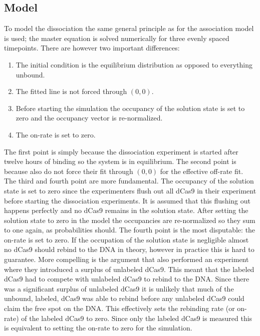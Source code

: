 \subsection{Model}
To model the dissociation the same general principle as for the association model is used; the master equation is solved numerically for three evenly spaced timepoints. There are however two important differences:

\begin{enumerate}
\item The initial condition is the equilibrium distribution as opposed to everything unbound.
\item The fitted line is not forced through $(0,0)$.
\item Before starting the simulation the occupancy of the solution state is set to zero and the occupancy vector is re-normalized.
\item The on-rate is set to zero.
\end{enumerate}

The first point is simply because the dissociation experiment is started after twelve hours of binding so the system is in equilibrium. The second point is because \cite{PNAS} also do not force their fit through $(0,0)$ for the effective off-rate fit. The third and fourth point are more fundamental. The occupancy of the solution state is set to zero since the experimenters flush out all dCas9 in their experiment before starting the dissociation experiments. It is assumed that this flushing out happens perfectly and no dCas9 remains in the solution state. After setting the solution state to zero in the model the occupancies are re-normalized so they sum to one again, as probabilities should. The fourth point is the most disputable: the on-rate is set to zero. If the occupation of the solution state is negligible almost no dCas9 should rebind to the DNA in theory, however in practice this is hard to guarantee. More compelling is the argument that \cite{PNAS} also performed an experiment where they introduced a surplus of unlabeled dCas9. This meant that the labeled dCas9 had to compete with unlabeled dCas9 to rebind to the DNA. Since there was a significant surplus of unlabeled dCas9 it is unlikely that much of the unbound, labeled, dCas9 was able to rebind before any unlabeled dCas9 could claim the free spot on the DNA. This effectively sets the rebinding rate (or on-rate) of the labeled dCas9 to zero. Since only the labeled dCas9 is measured this is equivalent to setting the on-rate to zero for the simulation.

